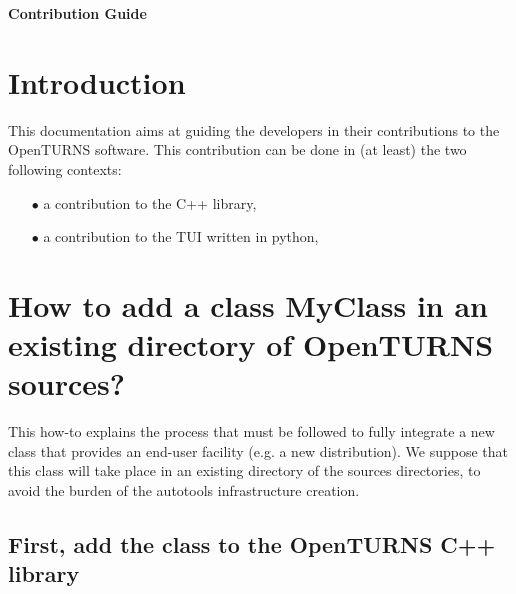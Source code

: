 \documentclass[11pt]{article}
\begin{document}
\begin{titlepage}
  \vspace*{2cm}
  \begin{center}
    {\huge \bf Contribution Guide}
    
  \end{center}
\end{titlepage}
\newpage
\tableofcontents

\newpage

\section{Introduction}

This documentation aims at guiding the developers in their contributions to the OpenTURNS software. This contribution can be done in (at least) the two following contexts:
\begin{itemize}
\item[$\bullet$]  a contribution to the C++ library,
\item[$\bullet$]  a contribution to the TUI written in python,
\end{itemize}


\section{How to add a class MyClass in an existing directory of OpenTURNS sources?\label{SingleClass}}

This how-to explains the process that must be followed to fully integrate a new class that provides an end-user facility (e.g. a new distribution). We suppose that this class will take place in an existing directory of the sources directories, to avoid the burden of the autotools infrastructure creation.

\subsection{First, add the class to the OpenTURNS C++ library}
\end{document}
